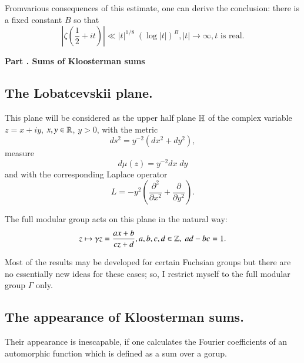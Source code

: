 From\pageoriginale various consequences of this estimate, one can derive the conclusion: there is a fixed constant $B$ so that 
$$
|\zeta (\frac{1}{2} + it)| \ll |t|^{1/8} \; (\log |t|)^B, |t| \to \infty, t \text{ is real.}
$$

\bigskip
\begin{center}
{\Large \textbf{Part .\label{art7-partI} Sums of Kloosterman sums}}
\end{center}

\setcounter{section}{1}
\subsection{The Lobatcevskii plane.}\label{art7-subsec1.1}
This plane will be considered as the upper half plane $\mathbb{H}$ of the complex variable $z = x + iy$, $x, y \in \mathbb{R}$, $y >0$, with the metric
\begin{equation}
ds^2 = y^{-2} (dx^2 + dy^2), \label{art7-eq1.1}
\end{equation}
measure
\begin{equation}
d\mu(z) = y^{-2} dx \; dy \label{art7-eq1.2}
\end{equation}
and with the corresponding Laplace operator 
\begin{equation}
L = - y^2 \left(\frac{\partial^2}{\partial x^2} + \frac{\partial}{\partial y^2} \right).\label{art7-eq1.3}
\end{equation}

The full modular group acts on this plane in the natural way:
\begin{equation}
z \mapsto \gamma z = \frac{ax+b}{cz+d}, a, b, c, d \in \mathbb{Z}, \; ad - bc = 1. \label{art7-eq1.4}
\end{equation}

Most of the results may be developed for certain Fuchsian groups but there are no essentially new ideas for these cases; so, I restrict myself to the full modular group $\Gamma$ only. 

\subsection{The appearance of Kloosterman sums.}\label{art7-subsec1.2}

Their appearance is inescapable, if one calculates the Fourier coefficients of an automorphic function which is defined as a sum over a gorup.

